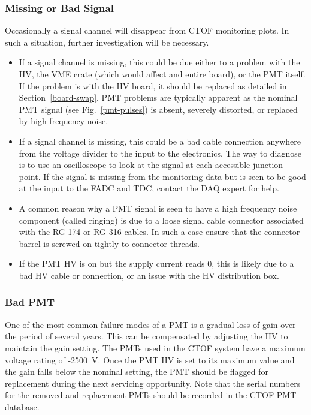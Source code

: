 \documentclass[12pt]{article}
\begin{document}
\subsubsection{Missing or Bad Signal}
\label{missing}

Occasionally a signal channel will disappear from CTOF monitoring plots. In such a situation, 
further investigation will be necessary. 

\begin{itemize}
\item If a signal channel is missing, this could be due either to a problem with the HV, the VME 
crate (which would affect and entire board), or the PMT itself. If the problem is with the HV 
board, it should be replaced as detailed in Section~\ref{board-swap}. PMT problems are typically 
apparent as the nominal PMT signal (see Fig.~\ref{pmt-pulses}) is absent, severely distorted, or 
replaced by high frequency noise.
\item If a signal channel is missing, this could be a bad cable connection anywhere from the 
voltage divider to the input to the electronics. The way to diagnose is to use an oscilloscope to 
look at the signal at each accessible junction point. If the signal is missing from the monitoring 
data but is seen to be good at the input to the FADC and TDC, contact the DAQ expert for help.
\item A common reason why a PMT signal is seen to have a high frequency noise component (called 
ringing) is due to a loose signal cable connector associated with the RG-174 or RG-316 cables. In 
such a case ensure that the connector barrel is screwed on tightly to connector threads.
\item If the PMT HV is on but the supply current reads 0, this is likely due to a bad HV cable or
connection, or an issue with the HV distribution box.
\end{itemize}

\subsubsection{Bad PMT}
\label{bad-pmt}

One of the most common failure modes of a PMT is a gradual loss of gain over the period of
several years. This can be compensated by adjusting the HV to maintain the gain setting. The
PMTs used in the CTOF system have a maximum voltage rating of -2500~V. Once the PMT HV is set 
to its maximum value and the gain falls below the nominal setting, the PMT should be flagged 
for replacement during the next servicing opportunity. Note that the serial numbers for the
removed and replacement PMTs should be recorded in the CTOF PMT database.
\end{document}
